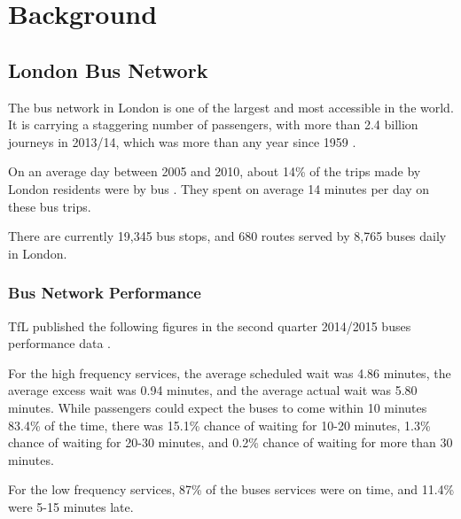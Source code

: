 \chapter{Background}

\section{London Bus Network}

\par The bus network in London is one of the largest and most accessible in the world. It is carrying a staggering number of passengers, with more than 2.4 billion journeys in 2013/14, which was more than any year since 1959 \cite{tfl_annual_report_13/14}.

\par On an average day between 2005 and 2010, about 14\% of the trips made by London residents were by bus \cite{tfl_ltds}. They spent on average 14 minutes per day on these bus trips.

\par There are currently 19,345 bus stops, and 680 routes served by 8,765 buses daily in London\cite{bus_stop_locations_routes}.


\subsection{Bus Network Performance}

\par TfL published the following figures in the second quarter 2014/2015 buses performance data \cite{buses_performance_report}.

\par For the high frequency services, the average scheduled wait was 4.86 minutes, the average excess wait was 0.94 minutes, and the average actual wait was 5.80 minutes. While passengers could expect the buses to come within 10 minutes 83.4\% of the time, there was 15.1\% chance of waiting for 10-20 minutes, 1.3\% chance of waiting for 20-30 minutes, and 0.2\% chance of waiting for more than 30 minutes.

\par For the low frequency services, 87\% of the buses services were on time, and 11.4\% were 5-15 minutes late.

